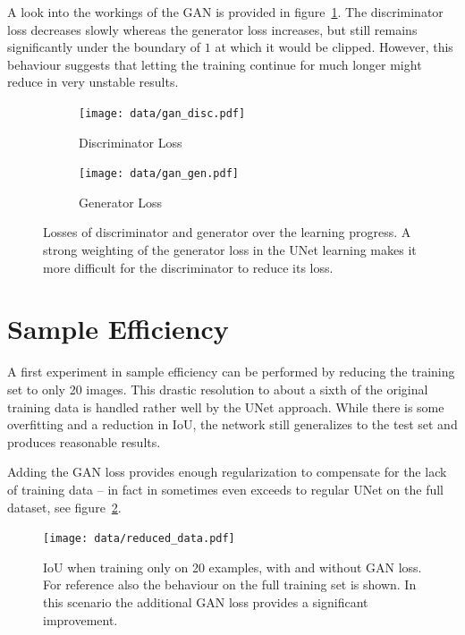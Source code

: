 \documentclass[aps,prl,twocolumn,groupedaddress,amsmath,amssymb]{revtex4-1}
\begin{document}
    A look into the workings of the GAN is provided in figure~\ref{fig:gan_losses}. The 
    discriminator loss decreases slowly whereas the generator loss increases, but still remains 
    significantly under the boundary of $1$ at which it would be clipped. However, this behaviour 
    suggests that letting the training continue for much longer might reduce in very unstable 
    results.
    \begin{figure}[tbp]
        \begin{subfigure}[c]{\linewidth}
            \texttt{[image: data/gan\_disc.pdf]}
            \caption{Discriminator Loss}
        \end{subfigure}
        \begin{subfigure}[c]{\linewidth}
            \texttt{[image: data/gan\_gen.pdf]}
            \caption{Generator Loss}
        \end{subfigure}
        \caption{Losses of discriminator and generator over the learning progress. A strong weighting
        of the generator loss in the UNet learning makes it more difficult for the discriminator to 
        reduce its loss.}
        \label{fig:gan_losses}
    \end{figure}

    \section{Sample Efficiency}
    A first experiment in sample efficiency can be performed by reducing the training set to only 20
    images. This drastic resolution to about a sixth of the original training data is handled rather
    well by the UNet approach. While there is some overfitting and a reduction in IoU, the network
    still generalizes to the test set and produces reasonable results.

    Adding the GAN loss provides enough regularization to compensate for the lack of training data 
    -- in fact in sometimes even exceeds to regular UNet on the full dataset, see 
    figure~\ref{fig:reduced_data}.

    \begin{figure}[tbp]
        \begin{center}
        \texttt{[image: data/reduced\_data.pdf]}
        \end{center}
        \caption{IoU when training only on 20 examples, with and without GAN loss. For reference
        also the behaviour on the full training set is shown. In this scenario the additional GAN
        loss provides a significant improvement.}
        \label{fig:reduced_data}
    \end{figure}
\end{document}
